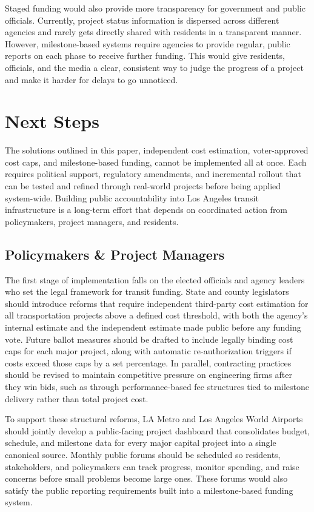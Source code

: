 \documentclass[12pt]{article}
\begin{document}
        Staged funding would also provide more transparency for government and public officials. Currently, project status information is dispersed across different agencies and rarely gets directly shared with residents in a transparent manner. However, milestone-based systems require agencies to provide regular, public reports on each phase to receive further funding. This would give residents, officials, and the media a clear, consistent way to judge the progress of a project and make it harder for delays to go unnoticed.

    \newpage
    \section{Next Steps}

    The solutions outlined in this paper, independent cost estimation, voter-approved cost caps, and milestone-based funding, cannot be implemented all at once. Each requires political support, regulatory amendments, and incremental rollout that can be tested and refined through real-world projects before being applied system-wide. Building public accountability into Los Angeles transit infrastructure is a long-term effort that depends on coordinated action from policymakers, project managers, and residents.

    \subsection{Policymakers \& Project Managers}

    The first stage of implementation falls on the elected officials and agency leaders who set the legal framework for transit funding. State and county legislators should introduce reforms that require independent third-party cost estimation for all transportation projects above a defined cost threshold, with both the agency's internal estimate and the independent estimate made public before any funding vote. Future ballot measures should be drafted to include legally binding cost caps for each major project, along with automatic re-authorization triggers if costs exceed those caps by a set percentage. In parallel, contracting practices should be revised to maintain competitive pressure on engineering firms after they win bids, such as through performance-based fee structures tied to milestone delivery rather than total project cost.

    To support these structural reforms, LA Metro and Los Angeles World Airports should jointly develop a public-facing project dashboard that consolidates budget, schedule, and milestone data for every major capital project into a single canonical source. Monthly public forums should be scheduled so residents, stakeholders, and policymakers can track progress, monitor spending, and raise concerns before small problems become large ones. These forums would also satisfy the public reporting requirements built into a milestone-based funding system.
\end{document}
